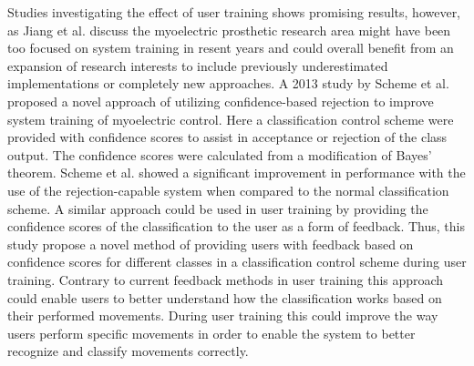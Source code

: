 Studies investigating the effect of user training shows promising results, however, as Jiang et al. \cite{Jiang2012} discuss the myoelectric prosthetic research area might have been too focused on system training in resent years and could overall benefit from an expansion of research interests to include previously underestimated implementations or completely new approaches. 
A 2013 study by Scheme et al. \cite{Scheme2013} proposed a novel approach of utilizing confidence-based rejection to improve system training of myoelectric control. Here a classification control scheme were provided with confidence scores to assist in acceptance or rejection of the class output. The confidence scores were calculated from a modification of Bayes' theorem. Scheme et al. \cite{Scheme2013} showed a significant improvement in performance with the use of the rejection-capable system when compared to the normal classification scheme. A similar approach could be used in user training by providing the confidence scores of the classification to the user as a form of feedback. 
Thus, this study propose a novel method of providing users with feedback based on confidence scores for different classes in a classification control scheme during user training. Contrary to current feedback methods in user training this approach could enable users to better understand how the classification works based on their performed movements. During user training this could improve the way users perform specific movements in order to enable the system to better recognize and classify movements correctly.






 
 
